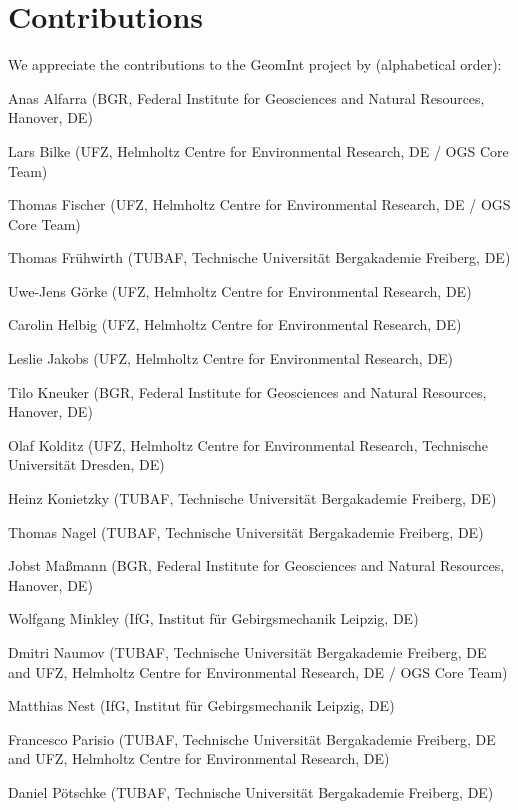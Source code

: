 \chapter*{Contributions}

We appreciate the contributions to the GeomInt project by  (alphabetical order):

\begin{list}{-}{\leftmargin=1em \itemindent=0em \itemsep=0.1em}
\item Anas Alfarra (BGR, Federal Institute for Geosciences and Natural Resources, Hanover, DE)	
\item Lars Bilke (UFZ, Helmholtz Centre for Environmental Research, DE / OGS Core Team)	
\item Thomas Fischer (UFZ, Helmholtz Centre for Environmental Research, DE / OGS Core Team)	
\item Thomas Fr\"uhwirth (TUBAF, Technische Universit\"at Bergakademie Freiberg, DE)	
\item Uwe-Jens G\"orke (UFZ, Helmholtz Centre for Environmental Research, DE)	
\item Carolin Helbig (UFZ, Helmholtz Centre for Environmental Research, DE)	
\item Leslie Jakobs (UFZ, Helmholtz Centre for Environmental Research, DE)
\item Tilo Kneuker (BGR, Federal Institute for Geosciences and Natural Resources, Hanover, DE)
\item Olaf Kolditz (UFZ, Helmholtz Centre for Environmental Research, Technische Universit\"at Dresden, DE) 
\item Heinz Konietzky (TUBAF, Technische Universit\"at Bergakademie Freiberg, DE)	
\item Thomas Nagel (TUBAF, Technische Universit\"at Bergakademie Freiberg, DE) 
\item Jobst Ma{\ss}mann (BGR, Federal Institute for Geosciences and Natural Resources, Hanover, DE)
\item Wolfgang Minkley (IfG, Institut für Gebirgsmechanik Leipzig, DE)	
\item Dmitri Naumov (TUBAF, Technische Universit\"at Bergakademie Freiberg, DE and UFZ, Helmholtz Centre for Environmental Research, DE / OGS Core Team)	
\item Matthias Nest (IfG, Institut für Gebirgsmechanik Leipzig, DE)	
\item Francesco Parisio (TUBAF, Technische Universit\"at Bergakademie Freiberg, DE and UFZ, Helmholtz Centre for Environmental Research, DE)	
\item Daniel P\"otschke (TUBAF, Technische Universit\"at Bergakademie Freiberg, DE)

\end{list}
